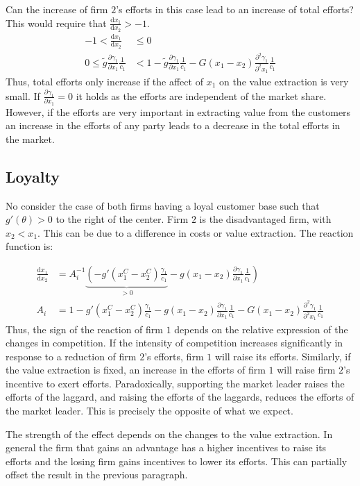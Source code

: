\documentclass[a4paper, 11pt]{article}
\renewcommand{\d}{\text{d}}
\begin{document}
Can the increase of firm $2$'s efforts in this case lead to an increase of total efforts? This would require that $\frac{\d x_1}{\d x_2} >-1$.
\begin{align*}
-1<\frac{\d x_1}{\d x_2}&\leq0\\
0\leq\tilde{g}\frac{\partial \gamma_1}{\partial x_1}\frac{1}{c_1}&<1 -\tilde{g}\frac{\partial \gamma_1}{\partial x_1}\frac{1}{c_1}-G(x_1-x_2)\frac{\partial^2 \gamma_1}{\partial^2 x_1}\frac{1}{c_1}
\end{align*}
Thus, total efforts only increase if the affect of $x_1$ on the value extraction is very small. If $\frac{\partial \gamma_1}{\partial x_1}=0$ it holds as the efforts are independent of the market share. However, if the efforts are very important in extracting value from the customers an increase in the efforts of any party leads to a decrease in the total efforts in the market.

\subsection{Loyalty}
No consider the case of both firms having a loyal customer base such that $g'(\theta)>0$ to the right of the center.  Firm $2$ is the disadvantaged firm, with $x_2<x_1$. This can be due to a difference in costs or value extraction. The reaction function is:

\begin{align}
\frac{\d x_1}{\d x_2} &= A_i^{-1} \underbrace{\left(-g'(x_1^C-x_2^C)\frac{\gamma_1}{c_1}\right.}_{>0} - \left.g(x_1-x_2)\frac{\partial \gamma_1}{\partial x_1}\frac{1}{c_1}\right)\\
A_i &= 1 - g'(x_1^C-x_2^C)\frac{\gamma_1}{c_1}-g(x_1-x_2)\frac{\partial \gamma_1}{\partial x_1}\frac{1}{c_1}-G(x_1-x_2)\frac{\partial^2 \gamma_1}{\partial^2 x_1}\frac{1}{c_1}
\end{align}
Thus, the sign of the reaction of firm $1$ depends on the relative expression of the changes in competition. If the intensity of competition increases significantly in response to a reduction of firm $2$'s efforts, firm $1$ will raise its efforts. Similarly, if the value extraction is fixed, an increase in the efforts of firm $1$ will raise firm $2$'s incentive to exert efforts. Paradoxically, supporting the market leader raises the efforts of the laggard, and raising the efforts of the laggards, reduces the efforts of the market leader. This is precisely the opposite of what we expect. 

The strength of the effect depends on the changes to the value extraction. In general the firm that gains an advantage has a higher incentives to raise its efforts and the losing firm gains incentives to lower its efforts. This can partially offset the result in the previous paragraph.
\end{document}
